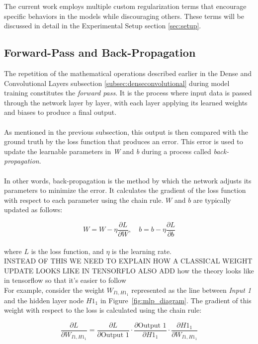 \noindent The current work employs multiple custom regularization terms 
that encourage specific behaviors in the models while discouraging others. 
These terms will be discussed in detail in the Experimental Setup section \ref{sec:setup}.


\subsection{Forward-Pass and Back-Propagation}
\label{subsec:forwardback}
The repetition of the mathematical operations described earlier in the Dense and Convolutional Layers subsection \ref{subsec:denseconvolutional} 
during model training constitutes the \textit{forward pass}. 
It is the process where input data is passed through the network layer by layer, 
with each layer applying its learned weights and biases to produce a final output. 
\\
\\
As mentioned in the previous subsection, this output is then compared with the ground truth by the loss function that produces an error.
This error is used to update the learnable parameters in \textit{W} and \textit{b} during a process called \textit{back-propagation}.
\\
\\
In other words, back-propagation is the method by which the network adjusts its parameters to minimize the error. 
It calculates the gradient of the loss function with respect to each parameter using the chain rule. 
\( W \) and \( b \) are typically updated as follows:

\[
W = W - \eta \frac{\partial L}{\partial W}, \quad b = b - \eta \frac{\partial L}{\partial b}
\]
\\
\noindent where \( L \) is the loss function, and \( \eta \) is the learning rate.
\\
INSTEAD OF THIS WE NEED TO EXPLAIN HOW A CLASSICAL WEIGHT UPDATE LOOKS LIKE IN TENSORFLO
ALSO ADD how the theory looks like in tensorflow so that it's easier to follow
\\
For example, consider the weight \( W_{I1,H1_1} \) represented as the line between \textit{Input 1} and the hidden layer node \( H1_1 \) in Figure~\ref{fig:mlp_diagram}. 
The gradient of this weight with respect to the loss is calculated using the chain rule:

\[
\frac{\partial L}{\partial W_{I1,H1_1}} = \frac{\partial L}{\partial \text{Output 1}} \cdot \frac{\partial \text{Output 1}}{\partial H1_1} \cdot \frac{\partial H1_1}{\partial W_{I1,H1_1}}
\]

